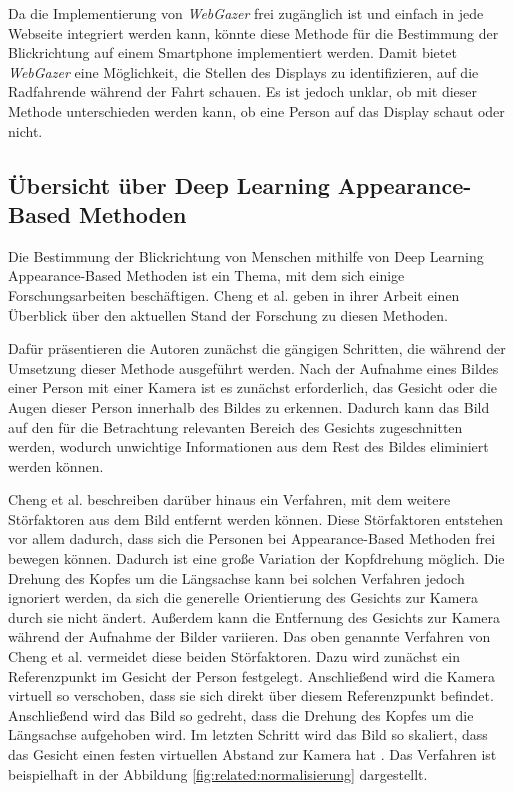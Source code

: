 Da die Implementierung von \textit{WebGazer} frei zugänglich ist und einfach in jede Webseite integriert werden kann, könnte diese Methode für die Bestimmung der Blickrichtung auf einem Smartphone implementiert werden. Damit bietet \textit{WebGazer} eine Möglichkeit, die Stellen des Displays zu identifizieren, auf die Radfahrende während der Fahrt schauen. Es ist jedoch unklar, ob mit dieser Methode unterschieden werden kann, ob eine Person auf das Display schaut oder nicht.

\subsection{Übersicht über Deep Learning Appearance-Based Methoden}\label{sec:related:gaze:appearance}

Die Bestimmung der Blickrichtung von Menschen mithilfe von Deep Learning Appearance-Based Methoden ist ein Thema, mit dem sich einige Forschungsarbeiten beschäftigen. Cheng et al. geben in ihrer Arbeit \cite{paper:basics:survey} einen Überblick über den aktuellen Stand der Forschung zu diesen Methoden.

Dafür präsentieren die Autoren zunächst die gängigen Schritten, die während der Umsetzung dieser Methode ausgeführt werden. Nach der Aufnahme eines Bildes einer Person mit einer Kamera ist es zunächst erforderlich, das Gesicht oder die Augen dieser Person innerhalb des Bildes zu erkennen. Dadurch kann das Bild auf den für die Betrachtung relevanten Bereich des Gesichts zugeschnitten werden, wodurch unwichtige Informationen aus dem Rest des Bildes eliminiert werden können.

Cheng et al. beschreiben darüber hinaus ein Verfahren, mit dem weitere Störfaktoren aus dem Bild entfernt werden können. Diese Störfaktoren entstehen vor allem dadurch, dass sich die Personen bei Appearance-Based Methoden frei bewegen können. Dadurch ist eine große Variation der Kopfdrehung möglich. Die Drehung des Kopfes um die Längsachse kann bei solchen Verfahren jedoch ignoriert werden, da sich die generelle Orientierung des Gesichts zur Kamera durch sie nicht ändert. Außerdem kann die Entfernung des Gesichts zur Kamera während der Aufnahme der Bilder variieren. Das oben genannte Verfahren von Cheng et al. vermeidet diese beiden Störfaktoren. Dazu wird zunächst ein Referenzpunkt im Gesicht der Person festgelegt. Anschließend wird die Kamera virtuell so verschoben, dass sie sich direkt über diesem Referenzpunkt befindet. Anschließend wird das Bild so gedreht, dass die Drehung des Kopfes um die Längsachse aufgehoben wird. Im letzten Schritt wird das Bild so skaliert, dass das Gesicht einen festen virtuellen Abstand zur Kamera hat \cite{paper:basics:survey}. Das Verfahren ist beispielhaft in der Abbildung \ref{fig:related:normalisierung} dargestellt.


